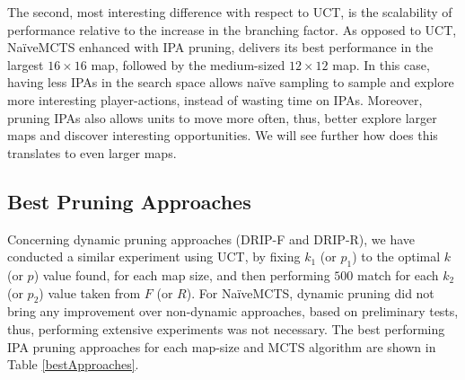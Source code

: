 \documentclass[conference]{IEEEtran}
\begin{document}
The second, most interesting difference with respect to UCT, is the scalability of performance relative to the increase in the branching factor. As opposed to UCT, NaïveMCTS enhanced with IPA pruning, delivers its best performance in the largest $16\times16$ map, followed by the medium-sized $12\times12$ map. In this case, having less IPAs in the search space allows naïve sampling to sample and explore more interesting player-actions, instead of wasting time on IPAs. Moreover, pruning IPAs also allows units to move more often, thus, better explore larger maps and discover interesting opportunities. We will see further how does this translates to even larger maps.


\subsection{Best Pruning Approaches}

Concerning dynamic pruning approaches (DRIP-F and DRIP-R), we have conducted a similar experiment using UCT, by fixing $k_1$ (or $p_1$) to the optimal $k$ (or $p$) value found, for each map size, and then performing $500$ match for each $k_2$ (or $p_2$) value taken from $F$ (or $R$). For NaïveMCTS, dynamic pruning did not bring any improvement over non-dynamic approaches, based on preliminary tests, thus, performing extensive experiments was not necessary. The best performing IPA pruning approaches for each map-size and MCTS algorithm are shown in Table \ref{bestApproaches}.

\begin{table}[!h]
\renewcommand{\arraystretch}{1.3}
\caption{Best Performing Pruning Approaches}
\label{bestApproaches}
\centering
{}
\end{table}

\end{document}
